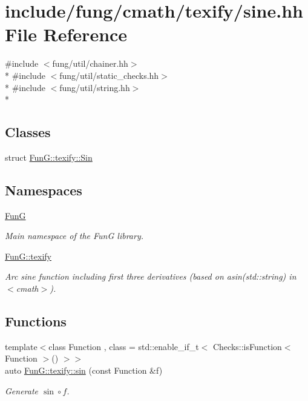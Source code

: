 \hypertarget{texify_2sine_8hh}{\section{include/fung/cmath/texify/sine.hh File Reference}
\label{texify_2sine_8hh}
}
{\ttfamily \#include $<$fung/util/chainer.\-hh$>$}\\*
{\ttfamily \#include $<$fung/util/static\-\_\-checks.\-hh$>$}\\*
{\ttfamily \#include $<$fung/util/string.\-hh$>$}\\*
\subsection*{Classes}
\begin{DoxyCompactItemize}
\item 
struct \hyperlink{structFunG_1_1texify_1_1Sin}{Fun\-G\-::texify\-::\-Sin}
\end{DoxyCompactItemize}
\subsection*{Namespaces}
\begin{DoxyCompactItemize}
\item 
\hyperlink{namespaceFunG}{Fun\-G}
\begin{DoxyCompactList}\small\item\em Main namespace of the Fun\-G library. \end{DoxyCompactList}\item 
\hyperlink{namespaceFunG_1_1texify}{Fun\-G\-::texify}
\begin{DoxyCompactList}\small\item\em Arc sine function including first three derivatives (based on asin(std\-::string) in $<$cmath$>$). \end{DoxyCompactList}\end{DoxyCompactItemize}
\subsection*{Functions}
\begin{DoxyCompactItemize}
\item 
{\footnotesize template$<$class Function , class  = std\-::enable\-\_\-if\-\_\-t$<$ Checks\-::is\-Function$<$ Function $>$() $>$$>$ }\\auto \hyperlink{group__TexifyCMathGroup_ga73e1c9636b3a075b61f8a3b00caea13f}{Fun\-G\-::texify\-::sin} (const Function \&f)
\begin{DoxyCompactList}\small\item\em Generate $ \sin\circ f $. \end{DoxyCompactList}\end{DoxyCompactItemize}
